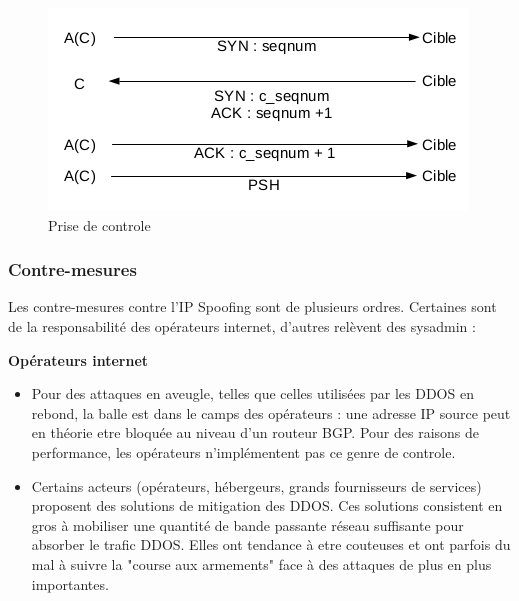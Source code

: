 \begin{figure}[hbtp]
\caption{Prise de controle}
\centering
\includegraphics[scale=1]{../images/ip-spoofing-control.png}
\end{figure}

\subsubsection{Contre-mesures}\label{vulnerabilites:reseau:spoofing:ip:countermeasures}

Les contre-mesures contre l'IP Spoofing sont de plusieurs ordres. Certaines sont de la responsabilité des opérateurs internet, d'autres relèvent des sysadmin :

\begin{tabbing}
\end{tabbing}
\textbf{Opérateurs internet}

\begin{itemize}
\item Pour des attaques en aveugle, telles que celles utilisées par les DDOS en rebond, la balle est dans le camps des opérateurs : une adresse IP source peut en théorie etre bloquée au niveau d'un routeur BGP. Pour des raisons de performance, les opérateurs n'implémentent pas ce genre de controle.
\item Certains acteurs (opérateurs, hébergeurs, grands fournisseurs de services) proposent des solutions de mitigation des DDOS. Ces solutions consistent en gros à mobiliser une quantité de bande passante réseau suffisante pour absorber le trafic DDOS. Elles ont tendance à etre couteuses et ont parfois du mal à suivre la "course aux armements" face à des attaques de plus en plus importantes.
\end{itemize}

